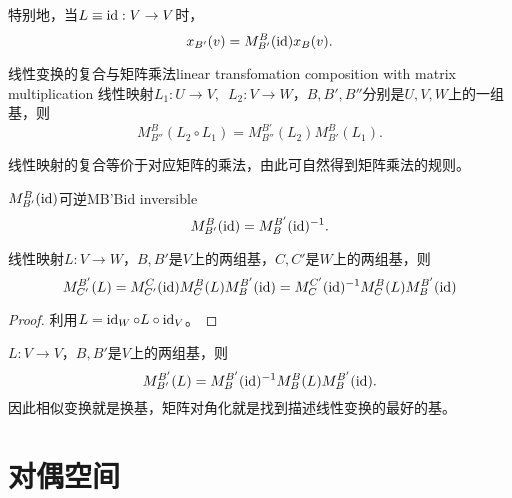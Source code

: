 \begin{corollary}
	特别地，当$L\equiv\operatorname{id}:V\to V$时， 
	\[
		x_{B'}(v)=M_{B'}^B(\operatorname{id})x_B(v).
	\]
\end{corollary}

\begin{theorem}{线性变换的复合与矩阵乘法}{linear transfomation composition with matrix multiplication}
	线性映射$L_1:U\to V,\enspace L_2:V\to W$，$B,B',B''$分别是$U,V,W$上的一组基，则
	\[
		M_{B''}^B(L_2\circ L_1)=M_{B''}^{B'}(L_2)M_{B'}^B(L_1).
	\]
\end{theorem}
\noindent 线性映射的复合等价于对应矩阵的乘法，由此可自然得到矩阵乘法的规则。
\begin{theorem}{$M_{B'}^B(\operatorname{id})$可逆}{MB'Bid inversible}
	\[
		M_{B'}^B(\operatorname{id})=M_B^{B'}(\operatorname{id})^{-1}.
	\]
\end{theorem}
\begin{theorem}{}{}
	线性映射$L:V\to W$，$B,B'$是$V$上的两组基，$C,C'$是$W$上的两组基，则
	\[
		M_{C'}^{B'}(L)=M_{C'}^C(\operatorname{id})M_C^B(L)M_B^{B'}(\operatorname{id})=M_C^{C'}(\operatorname{id})^{-1} M_C^B(L)M_B^{B'}(\operatorname{id})
	\]
\end{theorem}
\begin{proof}
	利用$L=\operatorname{id}_W\circ L\circ\operatorname{id}_V$。
\end{proof}
\begin{corollary}
	$L:V\to V$，$B,B'$是$V$上的两组基，则
	\[
		M_{B'}^{B'}(L)=M_B^{B'}(\operatorname{id})^{-1} M_B^B(L)M_B^{B'}(\operatorname{id}).
	\]
	因此相似变换就是换基，矩阵对角化就是找到描述线性变换的最好的基。
\end{corollary}

\section{对偶空间}

